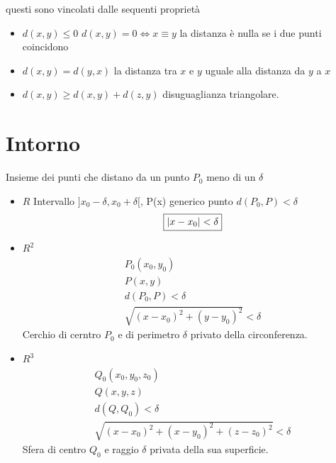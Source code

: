 \begin{pro}
  questi sono vincolati dalle sequenti proprietà
  \begin{itemize}
  \item $d(x,y)\leq 0$ $d(x,y)=0 \Leftrightarrow x\equiv y$ la distanza è nulla se i due punti coincidono
  \item $d(x,y) = d(y,x)$ la distanza tra $x$ e $y$ uguale alla distanza da $y$ a $x$
  \item $d(x,y)\geq d(x,y)+d(z,y)$ disuguaglianza triangolare.
  \end{itemize}
\end{pro}
\section{Intorno}
\begin{defi}
  Insieme dei punti che distano da un punto $P_0$ meno di un $\delta$
\end{defi}
\begin{itemize}
\item {\color{red} $R$} Intervallo $]x_0-\delta, x_0+\delta[$, P(x) generico punto $d(P_0,P)<\delta$
  \begin{equation*}
    \boxed{\lvert x-x_0\rvert<\delta}
  \end{equation*}
\item {\color{red} $R^2$}
  \begin{equation*}
    \begin{matrix}
      P_0(x_0,y_0)\\
      P(x,y)\\
      d(P_0,P)<\delta\\
      \boxed{\sqrt{(x-x_0)^2+(y-y_0)^2}<\delta}
    \end{matrix}
  \end{equation*}
  Cerchio di cerntro $P_0$ e di perimetro $\delta$ privato della circonferenza.
\item {\color{red}$R^3$}
  \begin{equation*}
    \begin{matrix}
      Q_0(x_0,y_0,z_0) \\
      Q(x,y,z)\\
      d(Q,Q_0)<\delta\\
      \sqrt{(x-x_0)^2+(x-y_0)^2+(z-z_0)^2}<\delta
    \end{matrix}
  \end{equation*}
  Sfera di centro $Q_0$ e raggio $\delta$ privata della sua superficie.
\end{itemize}
